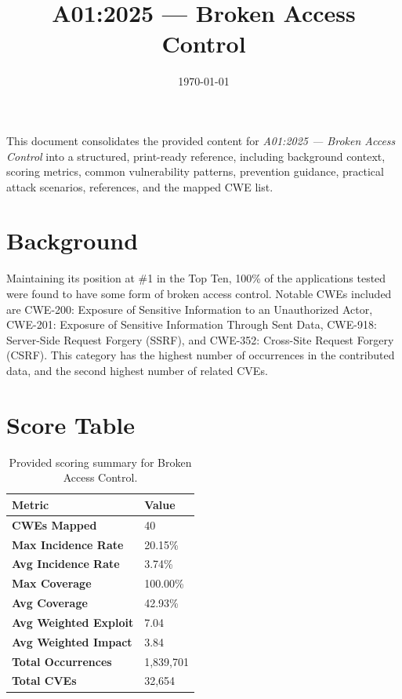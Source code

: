 \documentclass[11pt]{article}
\title{\textbf{A01:2025 — Broken Access Control}}
\date{\today}
\author{} %
\begin{document}
\maketitle

\begin{infobox}
This document consolidates the provided content for \textit{A01:2025 — Broken Access Control} into a structured, print-ready reference, including background context, scoring metrics, common vulnerability patterns, prevention guidance, practical attack scenarios, references, and the mapped CWE list.
\end{infobox}

\tableofcontents
\newpage

\section{Background}
Maintaining its position at \#1 in the Top Ten, 100\% of the applications tested were found to have some form of broken access control. Notable CWEs included are CWE-200: Exposure of Sensitive Information to an Unauthorized Actor, CWE-201: Exposure of Sensitive Information Through Sent Data, CWE-918: Server-Side Request Forgery (SSRF), and CWE-352: Cross-Site Request Forgery (CSRF). This category has the highest number of occurrences in the contributed data, and the second highest number of related CVEs.

\section{Score Table}
\begin{table}[h!]
\centering
\renewcommand{\arraystretch}{1.2}
\begin{tabular}{@{}>{\bfseries}p{4.6cm}p{3.4cm}@{}}
\toprule
Metric & Value \\
\midrule
CWEs Mapped & 40 \\
Max Incidence Rate & 20.15\% \\
Avg Incidence Rate & 3.74\% \\
Max Coverage & 100.00\% \\
Avg Coverage & 42.93\% \\
Avg Weighted Exploit & 7.04 \\
Avg Weighted Impact & 3.84 \\
Total Occurrences & 1,839,701 \\
Total CVEs & 32,654 \\
\bottomrule
\end{tabular}
\caption{Provided scoring summary for Broken Access Control.}
\end{table}
\end{document}
